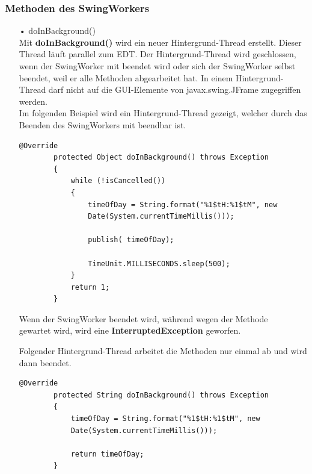 \subsubsection{Methoden des SwingWorkers}
\begin{itemize}
\item[•] doInBackground()
\\ Mit \textbf{doInBackground()} wird ein neuer Hintergrund-Thread erstellt. Dieser Thread läuft parallel zum \ac{EDT}. Der Hintergrund-Thread wird geschlossen, wenn der SwingWorker mit  beendet wird oder sich der SwingWorker selbst beendet, weil er alle Methoden abgearbeitet hat. In einem Hintergrund-Thread darf nicht auf die \ac{GUI}-Elemente von javax.swing.JFrame zugegriffen werden. 
\\ Im folgenden Beispiel wird ein Hintergrund-Thread gezeigt, welcher durch das Beenden des SwingWorkers mit  beendbar ist.
\begin{lstlisting}[style=JavaStyle, caption=SwingWorker \inlinecode{JavaStyle}{doInBackground()} mit while Schleife]
        @Override
        protected Object doInBackground() throws Exception
        {
            while (!isCancelled())
            {
                timeOfDay = String.format("%1$tH:%1$tM", new
                Date(System.currentTimeMillis()));

                publish( timeOfDay);

                TimeUnit.MILLISECONDS.sleep(500);
            }
            return 1;
        }
\end{lstlisting} 
Wenn der SwingWorker beendet wird, während wegen der Methode \\  gewartet wird, wird eine \textbf{InterruptedException} geworfen.

\vspace{10pt}

Folgender Hintergrund-Thread arbeitet die Methoden nur einmal ab und wird dann beendet. 
\begin{lstlisting}[style=JavaStyle, caption=SwingWorker \inlinecode{JavaStyle}{doInBackground()} ohne while Schleife, label=SwingWorkerOhneWhileSchleife]
        @Override
        protected String doInBackground() throws Exception
        {
            timeOfDay = String.format("%1$tH:%1$tM", new 
            Date(System.currentTimeMillis()));
            
            return timeOfDay;
        }
\end{lstlisting} 


\end{itemize}
